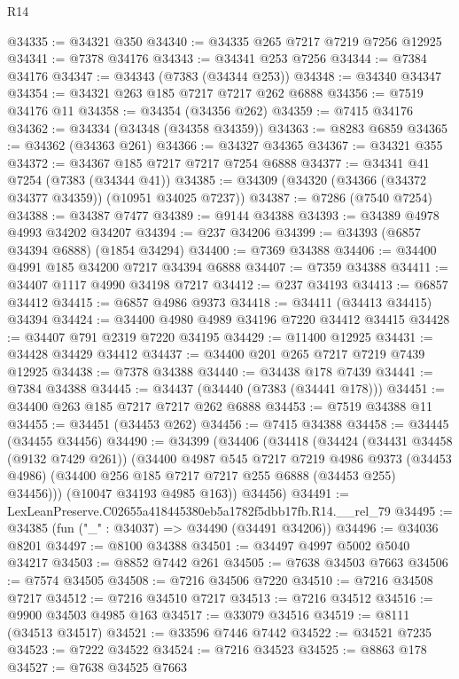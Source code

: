 \begin{lexlean}{R14}
\begin{coremodule}
@34335 := @34321 @350
@34340 := @34335 @265 @7217 @7219 @7256 @12925
@34341 := @7378 @34176
@34343 := @34341 @253 @7256
@34344 := @7384 @34176
@34347 := @34343 (@7383 (@34344 @253))
@34348 := @34340 @34347
@34354 := @34321 @263 @185 @7217 @7217 @262 @6888
@34356 := @7519 @34176 @11
@34358 := @34354 (@34356 @262)
@34359 := @7415 @34176
@34362 := @34334 (@34348 (@34358 @34359))
@34363 := @8283 @6859
@34365 := @34362 (@34363 @261)
@34366 := @34327 @34365
@34367 := @34321 @355
@34372 := @34367 @185 @7217 @7217 @7254 @6888
@34377 := @34341 @41 @7254 (@7383 (@34344 @41))
@34385 := @34309 (@34320 (@34366 (@34372 @34377 @34359)) (@10951 @34025 @7237))
@34387 := @7286 (@7540 @7254)
@34388 := @34387 @7477
@34389 := @9144 @34388
@34393 := @34389 @4978 @4993 @34202 @34207
@34394 := @237 @34206
@34399 := @34393 (@6857 @34394 @6888) (@1854 @34294)
@34400 := @7369 @34388
@34406 := @34400 @4991 @185 @34200 @7217 @34394 @6888
@34407 := @7359 @34388
@34411 := @34407 @1117 @4990 @34198 @7217
@34412 := @237 @34193
@34413 := @6857 @34412
@34415 := @6857 @4986 @9373
@34418 := @34411 (@34413 @34415) @34394
@34424 := @34400 @4980 @4989 @34196 @7220 @34412 @34415
@34428 := @34407 @791 @2319 @7220 @34195
@34429 := @11400 @12925
@34431 := @34428 @34429 @34412
@34437 := @34400 @201 @265 @7217 @7219 @7439 @12925
@34438 := @7378 @34388
@34440 := @34438 @178 @7439
@34441 := @7384 @34388
@34445 := @34437 (@34440 (@7383 (@34441 @178)))
@34451 := @34400 @263 @185 @7217 @7217 @262 @6888
@34453 := @7519 @34388 @11
@34455 := @34451 (@34453 @262)
@34456 := @7415 @34388
@34458 := @34445 (@34455 @34456)
@34490 := @34399
    (@34406
      (@34418
        (@34424
          (@34431 @34458 (@9132 @7429 @261))
          (@34400
            @4987
            @545
            @7217
            @7219
            @4986
            @9373
            (@34453 @4986)
            (@34400 @256 @185 @7217 @7217 @255 @6888 (@34453 @255) @34456)))
        (@10047 @34193 @4985 @163))
      @34456)
@34491 := LexLeanPreserve.C02655a418445380eb5a1782f5dbb17fb.R14.__rel_79
@34495 := @34385 (fun ("_" : @34037) => @34490 (@34491 @34206))
@34496 := @34036 @8201
@34497 := @8100 @34388
@34501 := @34497 @4997 @5002 @5040 @34217
@34503 := @8852 @7442 @261
@34505 := @7638 @34503 @7663
@34506 := @7574 @34505
@34508 := @7216 @34506 @7220
@34510 := @7216 @34508 @7217
@34512 := @7216 @34510 @7217
@34513 := @7216 @34512
@34516 := @9900 @34503 @4985 @163
@34517 := @33079 @34516
@34519 := @8111 (@34513 @34517)
@34521 := @33596 @7446 @7442
@34522 := @34521 @7235
@34523 := @7222 @34522
@34524 := @7216 @34523
@34525 := @8863 @178
@34527 := @7638 @34525 @7663

\end{coremodule}
\end{lexlean}
